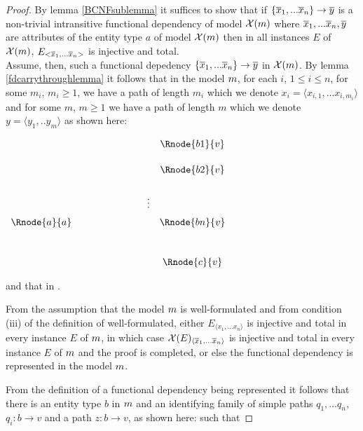 \begin{proof}
By lemma \ref{BCNFsublemma} it suffices to show that if 
$\left\{\overline{x}_1,...\overline{x}_n\right\} \rightarrow \overline{y}$ is a non-trivial intransitive functional dependency of model $\mathcal{X}({m})$
where $\overline{x}_1,...\overline{x}_n,\overline{y}$ are attributes of the entity type $a$ of model $\mathcal{X}({m})$ 
then  in all instances
$E$ of $\mathcal{X}({m})$, $E_{<\overline{x}_1,...\overline{x}_n>}$ is injective and total. \\


\noindent Assume, then, such a functional depedency $\left\{\overline{x}_1,...\overline{x}_n\right\} \rightarrow \overline{y}$ in  $\mathcal{X}({m})$. 
By lemma \ref{fdcarrythroughlemma} it follows that in the model ${m}$, for each $i$, $1 \leq i \leq n$, 
for some $m_i$, $m_i \geq 1$, we have a 
path of length $m_i$ which we denote $x_i = \langle x_{i,1},...x_{i,m_i} \rangle$  and for some $m$, $m \geq 1$ we have a path 
of length $m$ which we denote 
$y=\langle y_1,..y_m \rangle$ as shown here: 
\setlength{\arraycolsep}{.2cm}
\begin{center}
$
\begin{array}{cp{2cm}cc}
             & &         & \Rnode{b1}{v} \\ [0.5cm]
						 & &         & \Rnode{b2}{v} \\ [0.6cm]
						 & & \vdots  &                 \\ [0.2cm]
\Rnode{a}{a} & &         & \Rnode{bn}{v} \\ [1.0cm]
             & &         & \Rnode{c}{v}   \\
\end{array}
$
\end{center}
and that  in \genericmodel.

From the assumption that the model ${m}$ is well-formulated and from condition (iii) 
of the definition of well-formulated, either 
$E_{\langle x_1,...x_n \rangle}$ is injective and total in every instance $E$ of ${m}$, in which case 
$\mathcal{X}(E)_{\langle \overline{x}_1,...\overline{x}_n \rangle}$ is injective and total in every instance $E$ of ${m}$ and the proof is completed, or else
the functional dependency   is represented in the model ${m}$. 


From the definition of a functional dependency being represented it follows that
there is an entity type $b$ in ${m}$  and an identifying family of simple paths $q_1,...q_n$, 
$q_i: b \rightarrow v$ and a 
path $z: b \rightarrow v$, as shown here: 
such that



\end{proof}
